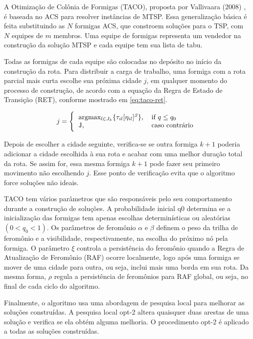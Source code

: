 A Otimização de Colônia de Formigas (TACO), proposta por Vallivaara (2008) \cite{vallivaara2008team}, é baseada no ACS para resolver instâncias de MTSP. Essa generalização básica é feita substituindo as $N$ formigas ACS, que constroem soluções para o TSP, com $N$ equipes de $m$ membros. Uma equipe de formigas representa um vendedor na construção da solução MTSP e cada equipe tem sua lista de tabu.

Todas as formigas de cada equipe são colocadas no depósito no início da construção da rota. Para distribuir a carga de trabalho, uma formiga com a rota parcial mais curta escolhe sua próxima cidade $j$, em qualquer momento do processo de construção, de acordo com a equação da Regra de Estado de Transição (RET), conforme mostrado em \ref{eq:taco-ret}.

\begin{equation} \label{eq:taco-ret} 
    j = \Bigg\{
        \begin{tabular}{ll}
        argmax\(_{l \in J_k} \{\tau_{il}[\eta_{il}]^\beta\}\), & if $q \leq q_0$ \\
        J, & caso contrário
        \end{tabular}
\end{equation}

Depois de escolher a cidade seguinte, verifica-se se outra formiga $k + 1$ poderia adicionar a cidade escolhida à sua rota e acabar com uma melhor duração total da rota. Se assim for, essa mesma formiga $k + 1$ pode fazer seu primeiro movimento não escolhendo $j$. Esse ponto de verificação evita que o algoritmo force soluções não ideais.

TACO tem vários parâmetros que são responsáveis pelo seu comportamento durante a construção de soluções. A probabilidade inicial q0 determina se a inicialização das formigas tem apenas escolhas determinísticas ou aleatórias $(0 < q_0 <1)$. Os parâmetros de feromônio $\alpha$ e $\beta$ definem o peso da trilha de feromônio e a visibilidade, respectivamente, na escolha do próximo nó pela formiga. O parâmetro $\xi$ controla a persistência do feromônio quando a Regra de Atualização de Feromônio (RAF) ocorre localmente, logo após uma formiga se mover de uma cidade para outra, ou seja, inclui mais uma borda em sua rota. Da mesma forma, $\rho$ regula a persistência de feromônios para RAF global, ou seja, no final de cada ciclo do algoritmo.

Finalmente, o algoritmo usa uma abordagem de pesquisa local para melhorar as soluções construídas. A pesquisa local opt-2 altera quaisquer duas arestas de uma solução e verifica se ela obtém alguma melhoria. O procedimento opt-2 é aplicado a todas as soluções construídas.

